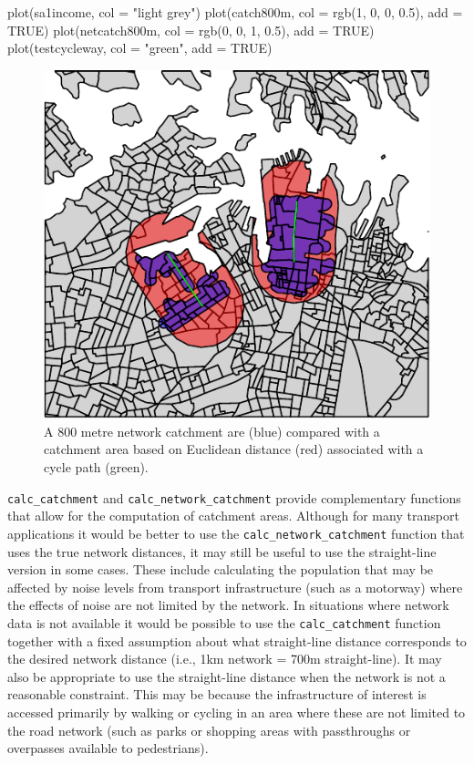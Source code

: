 \begin{Schunk}
\begin{Sinput}
plot(sa1income, col = "light grey")
plot(catch800m, col = rgb(1, 0, 0, 0.5), add = TRUE)
plot(netcatch800m, col = rgb(0, 0, 1, 0.5), add = TRUE)
plot(testcycleway, col = "green", add = TRUE)
\end{Sinput}
\begin{figure}
\includegraphics{netcatchplot-1} \caption[A 800 metre network catchment are (blue) compared with a catchment area based on Euclidean distance (red) associated with a cycle path (green)]{A 800 metre network catchment are (blue) compared with a catchment area based on Euclidean distance (red) associated with a cycle path (green).}\label{fig:netcatchplot}
\end{figure}
\end{Schunk}

\texttt{calc\_catchment} and \texttt{calc\_network\_catchment} provide complementary functions that allow for the computation of catchment areas.
Although for many transport applications it would be better to use the \texttt{calc\_network\_catchment} function that uses the true network distances, it may still be useful to use the straight-line version in some cases.
These include calculating the population that may be affected by noise levels from transport infrastructure (such as a motorway) where the effects of noise are not limited by the network.
In situations where network data is not available it would be possible to use the \texttt{calc\_catchment} function together with a fixed assumption about what straight-line distance corresponds to the desired network distance (i.e., 1km network = 700m straight-line).
It may also be appropriate to use the straight-line distance when the network is not a reasonable constraint.
This may be because the infrastructure of interest is accessed primarily by walking or cycling in an area where these are not limited to the road network (such as parks or shopping areas with passthroughs or overpasses available to pedestrians).

